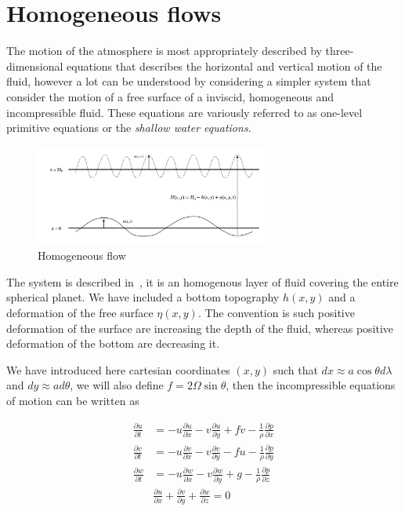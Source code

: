 \section{Homogeneous flows}\label{sec:homogeneous-flows}

The motion of the atmosphere is most appropriately described by
three-dimensional equations that describes the horizontal and vertical
motion of the fluid, however a lot can be understood by considering a
simpler system that consider the motion of a free surface of a inviscid,
homogeneous and incompressible fluid. These equations are variously
referred to as one-level primitive equations or the \textit{shallow water
	equations}.
\begin{figure}
	\centering
	\includegraphics[width=0.7\textwidth]{uploads/image732864.png}
	\caption{Homogeneous flow}
	\label{fig:homogeneous-flow}
\end{figure}

The system is described in~\fig{\ref{fig:homogeneous-flow}}, it is an homogenous
layer of fluid covering the entire spherical planet. We have included a
bottom topography \(h(x,y)\) and a deformation of the free surface
\(\eta(x,y)\). The convention is such positive deformation of the
surface are increasing the depth of the fluid, whereas positive
deformation of the bottom are decreasing it.

We have introduced here cartesian coordinates \((x,y)\) such that
\(dx \approx a \cos\theta d \lambda\) and \(dy \approx a d\theta\), we
will also define \(f= 2\Omega \sin\theta\), then the incompressible
equations of motion can be written as

\[
	\begin{aligned}
		\frac{\partial u}{\partial t} & = -u \frac{\partial u}{\partial x} -v \frac{\partial u}{\partial y} + f v -\frac{1}{\rho}\frac{\partial p}{\partial x} \\
		\frac{\partial v}{\partial t} & = -u \frac{\partial v}{\partial x} -v \frac{\partial v}{\partial y} - f u -\frac{1}{\rho}\frac{\partial p}{\partial y} \\
		\frac{\partial w}{\partial t} & = -u \frac{\partial w}{\partial x} -v \frac{\partial w}{\partial y} + g -\frac{1}{\rho}\frac{\partial p}{\partial z}   \\
		                              & \frac{\partial u}{\partial x} + \frac{\partial v}{\partial y} + \frac{\partial w}{\partial z} = 0
	\end{aligned}
\]

